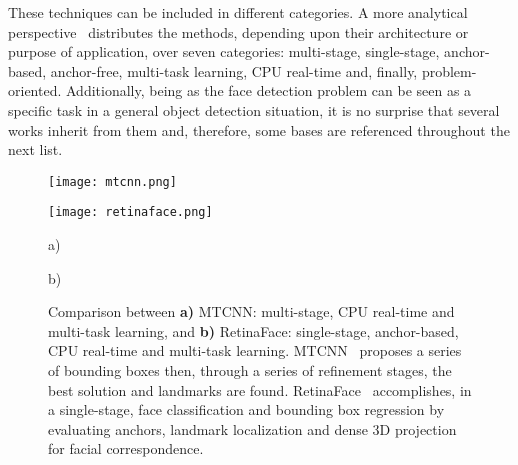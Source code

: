 \documentclass[class=report, crop=false, a4paper, 12pt]{standalone}
\begin{document}
\par These techniques can be included in different categories. A more analytical perspective~\autocite{duElementsEndtoendDeep2022} distributes the methods, depending upon their architecture or purpose of application, over seven categories: multi-stage, single-stage, anchor-based, anchor-free, multi-task learning, CPU real-time and, finally, problem-oriented. Additionally, being as the face detection problem can be seen as a specific task in a general object detection situation, it is no surprise that several works inherit from them and, therefore, some bases are referenced throughout the next list.

\vspace{0.5\baselineskip}
\begin{figure}[h!]
    \centering
    \begin{minipage}[c]{0.38\textwidth}
      \centering
      \texttt{[image: mtcnn.png]}
      \label{fig:mtcnn}
    \end{minipage}
    \hspace{0.5cm}
    \begin{minipage}[c]{0.52\textwidth}
      \centering
      \texttt{[image: retinaface.png]}
      \label{fig:retinaface}
    \end{minipage} 
    \begin{minipage}{0.4\textwidth}
        \vspace{-0.5cm}
        \centering
        \footnotesize a)
    \end{minipage}
    \hfill
    \begin{minipage}{0.4\textwidth}
        \vspace{-0.5cm}
        \centering
        \footnotesize b)
    \end{minipage}
    \vspace{-0.4cm}
    \caption{Comparison between \textbf{a)} MTCNN: multi-stage, CPU real-time and multi-task learning, and \textbf{b)} RetinaFace: single-stage, anchor-based, CPU real-time and multi-task learning. MTCNN~\autocite{zhangJointFaceDetection2016a} proposes a series of bounding boxes then, through a series of refinement stages, the best solution and landmarks are found. RetinaFace~\autocite{dengRetinaFaceSinglestageDense2019} accomplishes, in a single-stage, face classification and bounding box regression by evaluating anchors, landmark localization and dense 3D projection for facial correspondence.}
    \label{fig:mtcnn vs retinaface}
\end{figure}
  
\end{document}
